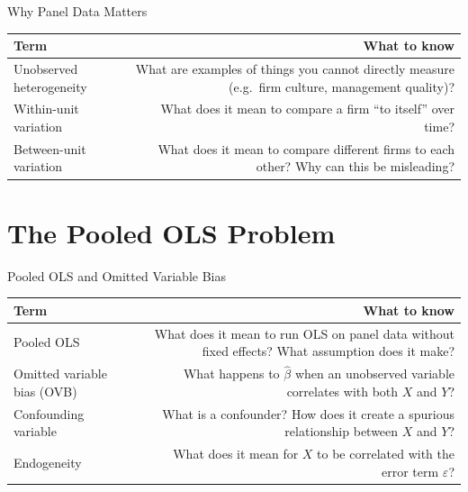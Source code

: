 \documentclass[9pt,aspectratio=169]{beamer}
\begin{document}
\begin{frame}{Why Panel Data Matters}

\begin{tabular}{@{}lR@{}}
\toprule
\textbf{Term} & \textbf{What to know} \\
\midrule
\alert{Unobserved heterogeneity} & What are examples of things you cannot directly measure (e.g.\ firm culture, management quality)? \\[0.8em]
\alert{Within-unit variation} & What does it mean to compare a firm ``to itself'' over time? \\[0.8em]
\alert{Between-unit variation} & What does it mean to compare different firms to each other? Why can this be misleading? \\
\bottomrule
\end{tabular}

\end{frame}


\section{The Pooled OLS Problem}

\begin{frame}{Pooled OLS and Omitted Variable Bias}

\begin{tabular}{@{}lR@{}}
\toprule
\textbf{Term} & \textbf{What to know} \\
\midrule
\alert{Pooled OLS} & What does it mean to run OLS on panel data without fixed effects? What assumption does it make? \\[0.8em]
\alert{Omitted variable bias (OVB)} & What happens to $\hat{\beta}$ when an unobserved variable correlates with both $X$ and $Y$? \\[0.8em]
\alert{Confounding variable} & What is a confounder? How does it create a spurious relationship between $X$ and $Y$? \\[0.8em]
\alert{Endogeneity} & What does it mean for $X$ to be correlated with the error term $\varepsilon$? \\
\bottomrule
\end{tabular}

\end{frame}


\end{document}
